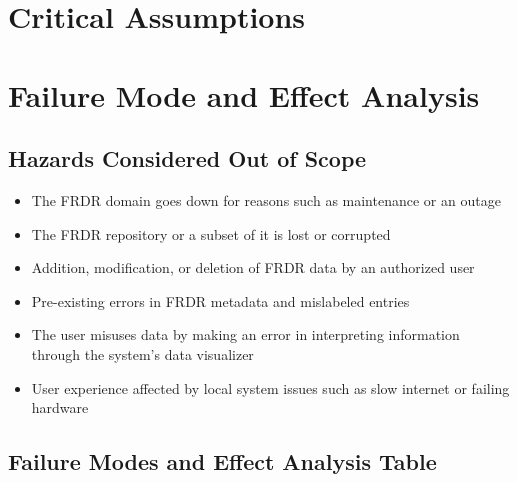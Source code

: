 \documentclass{article}
\begin{document}
\section{Critical Assumptions}


\section{Failure Mode and Effect Analysis}

\subsection{Hazards Considered Out of Scope}

\begin{itemize}
    \item The FRDR domain goes down for reasons such as maintenance or an outage
    \item The FRDR repository or a subset of it is lost or corrupted
    \item Addition, modification, or deletion of FRDR data by an authorized user
    \item Pre-existing errors in FRDR metadata and mislabeled entries
    \item The user misuses data by making an error in interpreting information through the system's data visualizer
    \item User experience affected by local system issues such as slow internet or failing hardware
\end{itemize}

\subsection{Failure Modes and Effect Analysis Table}
\end{document}
